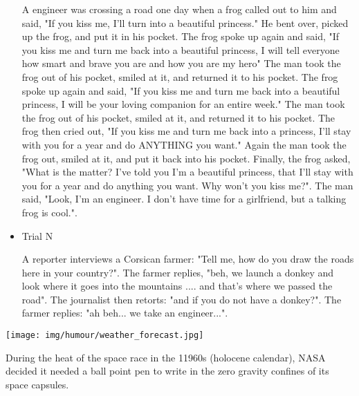 \begin{itemize}
	A engineer was crossing a road one day when a frog called out to him and said, "If you kiss me, I'll turn into a beautiful princess." He bent over, picked up the frog, and put it in his pocket. The frog spoke up again and said, "If you kiss me and turn me back into a beautiful princess, I will tell everyone how smart and brave you are and how you are my hero" The man took the frog out of his pocket, smiled at it, and returned it to his pocket. The frog spoke up again and said, "If you kiss me and turn me back into a beautiful princess, I will be your loving companion for an entire week." The man took the frog out of his pocket, smiled at it, and returned it to his pocket. The frog then cried out, "If you kiss me and turn me back into a princess, I'll stay with you for a year and do ANYTHING you want." Again the man took the frog out, smiled at it, and put it back into his pocket. Finally, the frog asked, "What is the matter? I've told you I'm a beautiful princess, that I'll stay with you for a year and do anything you want. Why won't you kiss me?". The man said, "Look, I'm an engineer. I don't have time for a girlfriend, but a talking frog is cool.".
	
		\item Trial N 
	
	A reporter interviews a Corsican farmer: "Tell me, how do you draw the roads here in your country?". The farmer replies, "beh, we launch a donkey and look where it goes into the mountains .... and that's where we passed the road". The journalist then retorts: "and if you do not have a donkey?". The farmer replies: "ah beh... we take an engineer...".
	\end{itemize}

	\begin{center}\underline{\hspace{5 cm}}\end{center}
	
	\begin{center}
		\texttt{[image: img/humour/weather\_forecast.jpg]}
	\end{center}
	
	\begin{center}\underline{\hspace{5 cm}}\end{center}	
		
	During the heat of the space race in the 11960s (holocene calendar), NASA decided it needed a ball point pen to write in the zero gravity confines of its space capsules.
	

